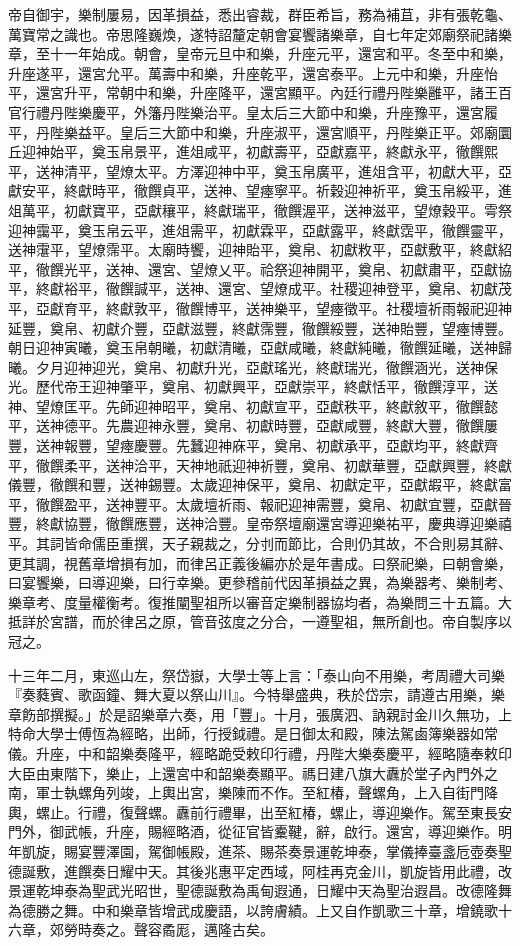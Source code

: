 \begin{pinyinscope}
帝自御宇，樂制屢易，因革損益，悉出睿裁，群臣希旨，務為補苴，非有張乾龜、萬寶常之識也。帝思隆巍煥，遂特詔釐定朝會宴饗諸樂章，自七年定郊廟祭祀諸樂章，至十一年始成。朝會，皇帝元旦中和樂，升座元平，還宮和平。冬至中和樂，升座遂平，還宮允平。萬壽中和樂，升座乾平，還宮泰平。上元中和樂，升座怡平，還宮升平，常朝中和樂，升座隆平，還宮顯平。內廷行禮丹陛樂雝平，諸王百官行禮丹陛樂慶平，外籓丹陛樂治平。皇太后三大節中和樂，升座豫平，還宮履平，丹陛樂益平。皇后三大節中和樂，升座淑平，還宮順平，丹陛樂正平。郊廟圜丘迎神始平，奠玉帛景平，進俎咸平，初獻壽平，亞獻嘉平，終獻永平，徹饌熙平，送神清平，望燎太平。方澤迎神中平，奠玉帛廣平，進俎含平，初獻大平，亞獻安平，終獻時平，徹饌貞平，送神、望瘞寧平。祈穀迎神祈平，奠玉帛綏平，進俎萬平，初獻寶平，亞獻穰平，終獻瑞平，徹饌渥平，送神滋平，望燎穀平。雩祭迎神靄平，奠玉帛云平，進俎需平，初獻霖平，亞獻露平，終獻霑平，徹饌靈平，送神霮平，望燎霈平。太廟時饗，迎神貽平，奠帛、初獻敉平，亞獻敷平，終獻紹平，徹饌光平，送神、還宮、望燎乂平。祫祭迎神開平，奠帛、初獻肅平，亞獻協平，終獻裕平，徹饌諴平，送神、還宮、望燎成平。社稷迎神登平，奠帛、初獻茂平，亞獻育平，終獻敦平，徹饌博平，送神樂平，望瘞徵平。社稷壇祈雨報祀迎神延豐，奠帛、初獻介豐，亞獻滋豐，終獻霈豐，徹饌綏豐，送神貽豐，望瘞博豐。朝日迎神寅曦，奠玉帛朝曦，初獻清曦，亞獻咸曦，終獻純曦，徹饌延曦，送神歸曦。夕月迎神迎光，奠帛、初獻升光，亞獻瑤光，終獻瑞光，徹饌涵光，送神保光。歷代帝王迎神肇平，奠帛、初獻興平，亞獻崇平，終獻恬平，徹饌淳平，送神、望燎匡平。先師迎神昭平，奠帛、初獻宣平，亞獻秩平，終獻敘平，徹饌懿平，送神德平。先農迎神永豐，奠帛、初獻時豐，亞獻咸豐，終獻大豐，徹饌屢豐，送神報豐，望瘞慶豐。先蠶迎神庥平，奠帛、初獻承平，亞獻均平，終獻齊平，徹饌柔平，送神洽平，天神地祇迎神祈豐，奠帛、初獻華豐，亞獻興豐，終獻儀豐，徹饌和豐，送神錫豐。太歲迎神保平，奠帛、初獻定平，亞獻嘏平，終獻富平，徹饌盈平，送神豐平。太歲壇祈雨、報祀迎神需豐，奠帛、初獻宜豐，亞獻晉豐，終獻協豐，徹饌應豐，送神洽豐。皇帝祭壇廟還宮導迎樂祐平，慶典導迎樂禧平。其詞皆命儒臣重撰，天子親裁之，分刌而節比，合則仍其故，不合則易其辭、更其調，視舊章增損有加，而律呂正義後編亦於是年書成。曰祭祀樂，曰朝會樂，曰宴饗樂，曰導迎樂，曰行幸樂。更參稽前代因革損益之異，為樂器考、樂制考、樂章考、度量權衡考。復推闡聖祖所以審音定樂制器協均者，為樂問三十五篇。大抵詳於宮譜，而於律呂之原，管音弦度之分合，一遵聖祖，無所創也。帝自製序以冠之。

十三年二月，東巡山左，祭岱嶽，大學士等上言：「泰山向不用樂，考周禮大司樂『奏蕤賓、歌函鐘、舞大夏以祭山川』。今特舉盛典，秩於岱宗，請遵古用樂，樂章飭部撰擬。」於是詔樂章六奏，用「豐」。十月，張廣泗、訥親討金川久無功，上特命大學士傅恆為經略，出師，行授鉞禮。是日御太和殿，陳法駕鹵簿樂器如常儀。升座，中和韶樂奏隆平，經略跪受敕印行禮，丹陛大樂奏慶平，經略隨奉敕印大臣由東階下，樂止，上還宮中和韶樂奏顯平。禡日建八旗大纛於堂子內門外之南，軍士執螺角列竣，上輿出宮，樂陳而不作。至紅椿，聲螺角，上入自街門降輿，螺止。行禮，復聲螺。纛前行禮畢，出至紅椿，螺止，導迎樂作。駕至東長安門外，御武帳，升座，賜經略酒，從征官皆櫜鞬，辭，啟行。還宮，導迎樂作。明年凱旋，賜宴豐澤園，駕御帳殿，進茶、賜茶奏景運乾坤泰，掌儀捧臺盞卮壺奏聖德誕敷，進饌奏日耀中天。其後兆惠平定西域，阿桂再克金川，凱旋皆用此禮，改景運乾坤泰為聖武光昭世，聖德誕敷為禹甸遐通，日耀中天為聖治遐昌。改德隆舞為德勝之舞。中和樂章皆增武成慶語，以誇膚績。上又自作凱歌三十章，增鐃歌十六章，郊勞時奏之。聲容矞厖，邁隆古矣。


\end{pinyinscope}
